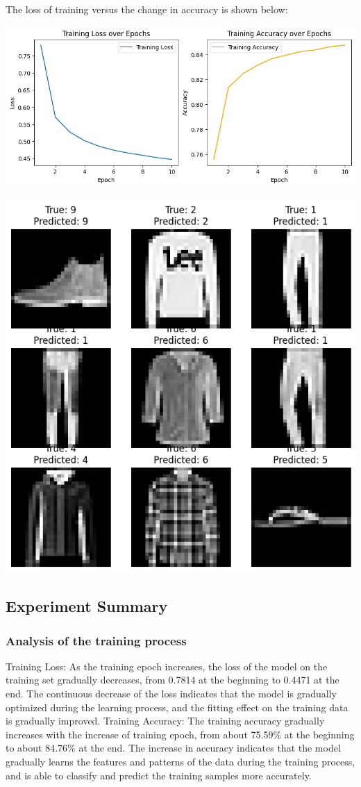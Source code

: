 \documentclass[a4paper,12pt]{article}
\begin{document}
The loss of training versus the change in accuracy is shown below:

\centering %
\includegraphics[width=0.8\linewidth]{images/lab1_2_loss.png}


\includegraphics[width=0.8\linewidth]{images/lab1_2_result.png}

\justifying
\subsection{Experiment Summary}
\subsubsection{Analysis of the training process}
Training Loss:
As the training epoch increases, the loss of the model on the training set gradually decreases, from 0.7814 at the beginning to 0.4471 at the end.
The continuous decrease of the loss indicates that the model is gradually optimized during the learning process, and the fitting effect on the training data is gradually improved.
Training Accuracy:
The training accuracy gradually increases with the increase of training epoch, from about 75.59\% at the beginning to about 84.76\% at the end.
The increase in accuracy indicates that the model gradually learns the features and patterns of the data during the training process, and is able to classify and predict the training samples more accurately.
\end{document}
